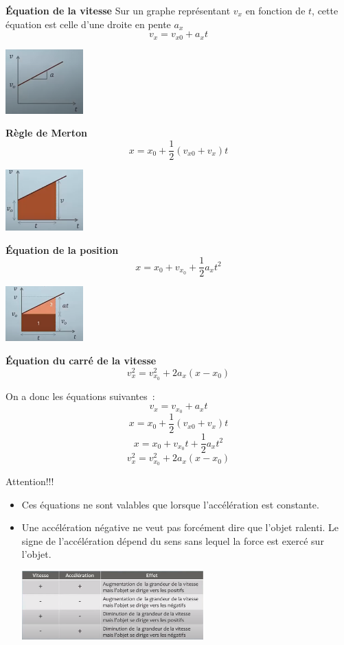 \documentclass{article}
\begin{document}
\noindent
\textbf{Équation de la vitesse}
\newline
\noindent
Sur un graphe représentant $v_x$ en fonction de $t$, cette équation est celle d'une droite en pente $a_x$
\[v_x = v_{x0} + a_xt\]
\begin{center}
    \includegraphics[width=3cm]{Image/EquationVitesse.png}
\end{center}
\noindent
\textbf{Règle de Merton}
\[x = x_0 + \frac{1}{2}(v_{x0} + v_x)t\]
\begin{center}
    \includegraphics[width=3cm]{Image/EquationMerton.png}
\end{center}
\noindent
\textbf{Équation de la position}
\[x = x_0 + v_{x_0} + \frac{1}{2}a_xt^2\]
\begin{center}
    \includegraphics[width=3cm]{Image/Postition.png}
\end{center}
\noindent
\textbf{Équation du carré de la vitesse}
\[v^2_x = v^2_{x_0} + 2a_x(x - x_0)\]
\newline

\noindent
On a donc les équations suivantes :
\[v_x = v_{x_0} + a_xt\]
\[x = x_0 + \frac{1}{2}(v_{x0} + v_x)t\]
\[x = x_0 + v_{x_0}t + \frac{1}{2}a_xt^2\]
\[v^2_x = v^2_{x_0} + 2a_x(x - x_0)\]


\noindent
Attention!!! 
\begin{itemize}
    \item Ces équations ne sont valables que lorsque l'accélération est constante.
    \item Une accélération négative ne veut pas forcément dire que l'objet ralenti. Le signe de l'accélération dépend du sens sans lequel la force est exercé sur l'objet.
    
    \includegraphics[width=7cm]{Image/RemarqueVitesse.png}
\end{itemize}
\end{document}
